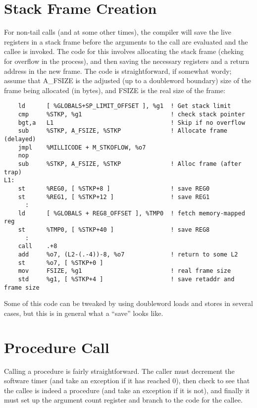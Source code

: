 \section{Stack Frame Creation}

For non-tail calls (and at some other times), the compiler will save
the live registers in a stack frame before the arguments to the call
are evaluated and the callee is invoked. The code for this involves
allocating the stack frame (cheking for overflow in the process), and
then saving the necessary registers and a return address in the new
frame. The code is straightforward, if somewhat wordy; assume that
A\_FSIZE is the adjusted (up to a doubleword boundary) size of the
frame being allocated (in bytes), and FSIZE is the real size of the
frame:

\begin{verbatim}
    ld      [ %GLOBALS+SP_LIMIT_OFFSET ], %g1  ! Get stack limit
    cmp     %STKP, %g1                         ! check stack pointer
    bgt,a   L1                                 ! Skip if no overflow
    sub     %STKP, A_FSIZE, %STKP              ! Allocate frame (delayed)
    jmpl    %MILLICODE + M_STKOFLOW, %o7
    nop
    sub     %STKP, A_FSIZE, %STKP              ! Alloc frame (after trap)
L1:
    st      %REG0, [ %STKP+8 ]                 ! save REG0
    st      %REG1, [ %STKP+12 ]                ! save REG1
      :
    ld      [ %GLOBALS + REG8_OFFSET ], %TMP0  ! fetch memory-mapped reg
    st      %TMP0, [ %STKP+40 ]                ! save REG8
      :
    call    .+8
    add     %o7, (L2-(.-4))-8, %o7             ! return to some L2
    st      %o7, [ %STKP+0 ] 
    mov     FSIZE, %g1                         ! real frame size
    std     %g1, [ %STKP+4 ]                   ! save retaddr and frame size
\end{verbatim}

Some of this code can be tweaked by using doubleword loads and stores in
several cases, but this is in general what a ``save'' looks like.

\section{Procedure Call}

Calling a procedure is fairly straightforward. The caller must decrement
the software timer (and take an exception if it has reached 0), then check
to see that the callee is indeed a procedure (and take an exception if it
is not), and finally it must set up the argument count register and branch
to the code for the callee.

